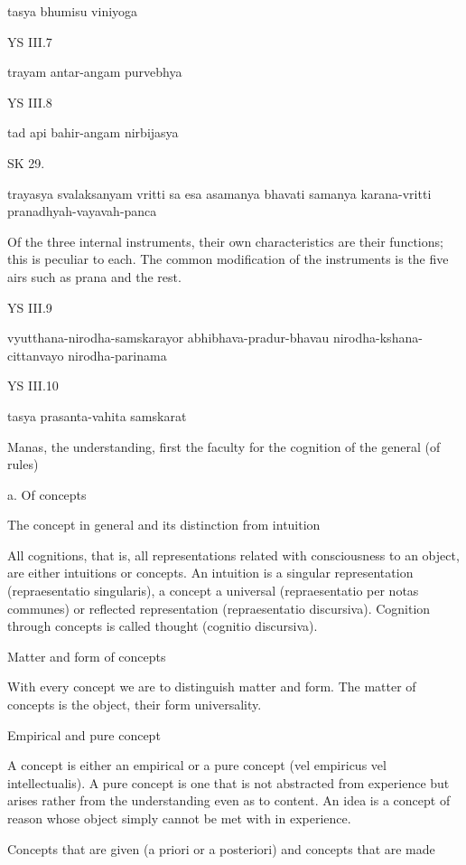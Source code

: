     tasya bhumisu viniyoga

YS III.7

    trayam antar-angam purvebhya

YS III.8

    tad api bahir-angam nirbijasya

SK 29.

trayasya svalaksanyam vritti sa esa asamanya bhavati
samanya karana-vritti pranadhyah-vayavah-panca

Of the three internal instruments,
their own characteristics are their functions;
this is peculiar to each.
The common modification of the instruments is the five airs
such as prana and the rest.

YS III.9

    vyutthana-nirodha-samskarayor abhibhava-pradur-bhavau
    nirodha-kshana-cittanvayo nirodha-parinama

YS III.10

    tasya prasanta-vahita samskarat

    Manas, the understanding, first the faculty
    for the cognition of the general (of rules)

    a. Of concepts

    The concept in general and its distinction from intuition

        All cognitions, that is,
        all representations related with consciousness to an object,
        are either intuitions or concepts.
        An intuition is a singular representation (repraesentatio singularis),
        a concept a universal (repraesentatio per notas communes)
        or reflected representation (repraesentatio discursiva).
        Cognition through concepts is called thought (cognitio discursiva).

    Matter and form of concepts

        With every concept we are to distinguish matter and form.
        The matter of concepts is the object,
        their form universality.

    Empirical and pure concept

        A concept is either an empirical or a pure concept
        (vel empiricus vel intellectualis).
        A pure concept is one that is not abstracted from experience
        but arises rather from the understanding even as to content.
        An idea is a concept of reason whose object
        simply cannot be met with in experience.

    Concepts that are given (a priori or a posteriori)
    and concepts that are made

